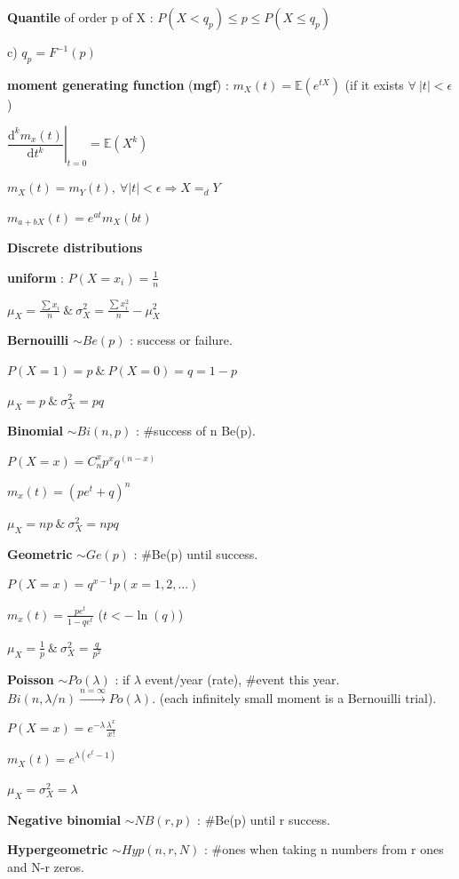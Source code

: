\documentclass[a4paper,10.5pt]{article}
\newcommand{\ud}{\mathrm{d}}
\begin{document}
\begin{multicols}{4}
		\textbf{Quantile} of order p of X : $P(X<q_p) \leq p \leq P(X\leq q_p)$
		
		c) $q_p = F^{-1}(p)$
		
		\textbf{moment generating function} (\textbf{mgf}) : $m_X(t) = \mathbb{E}(e^{tX})$ (if it exists $\forall\  |t|<\epsilon$)
		
		$\left.\dfrac{\ud^k m_x(t)}{\ud t^k}\right|_{t=0} = \mathbb{E}(X^k)$
		
		$m_X(t) = m_Y(t),\ \forall |t|<\epsilon \Rightarrow X =_d Y$
		
		$m_{a+bX}(t) = e^{at}m_X(bt)$
		
		\textbf{Discrete distributions}
		
		\textbf{uniform} : $P(X = x_i) = \frac{1}{n}$
		
		$\mu_X = \frac{\sum x_i}{n}\ \&\ \sigma_X^2 = \frac{\sum x_i^2}{n}-\mu_X^2$
		
		\textbf{Bernouilli} $\sim Be(p)$ : success or failure.
		
		$P(X=1) = p\ \&\ P(X=0) = q = 1-p$
		
		$\mu_X = p\ \&\ \sigma_X^2 = pq$
		
		\textbf{Binomial} $\sim Bi(n,p)$ : \#success of n Be(p).
		
		$P(X=x) = C_n^x p^x q^{(n-x)}$
		
		$m_x(t) = (pe^t+q)^n$
		
		$\mu_X = np\ \&\ \sigma_X^2 = npq$
		
		\textbf{Geometric} $\sim Ge(p)$ : \#Be(p) until success.
		
		$P(X=x) = q^{x-1}p (x=1,2,...)$
		
		$m_x(t) = \frac{pe^t}{1-qe^t}$ ($t<-\ln(q)$)
		
		$\mu_X = \frac{1}{p}\ \&\ \sigma_X^2 = \frac{q}{p^2}$
		
		\textbf{Poisson} $\sim Po(\lambda)$ : if $\lambda$ event/year (rate), \#event this year. $Bi(n,\lambda/n) \overset{n=\infty}\longrightarrow Po(\lambda)$. (each infinitely small moment is a Bernouilli trial).
		
		$P(X=x) = e^{-\lambda}\frac{\lambda^x}{x!}$
		
		$m_X(t) = e^{\lambda(e^t-1)}$
		
		$\mu_X = \sigma_X^2 = \lambda$
		
		\textbf{Negative binomial} $\sim NB(r,p)$ : \#Be(p) until r success.
		
		\textbf{Hypergeometric} $\sim Hyp(n,r,N)$ : \#ones when taking n numbers from r ones and N-r zeros.
		

\end{multicols}
\end{document}
